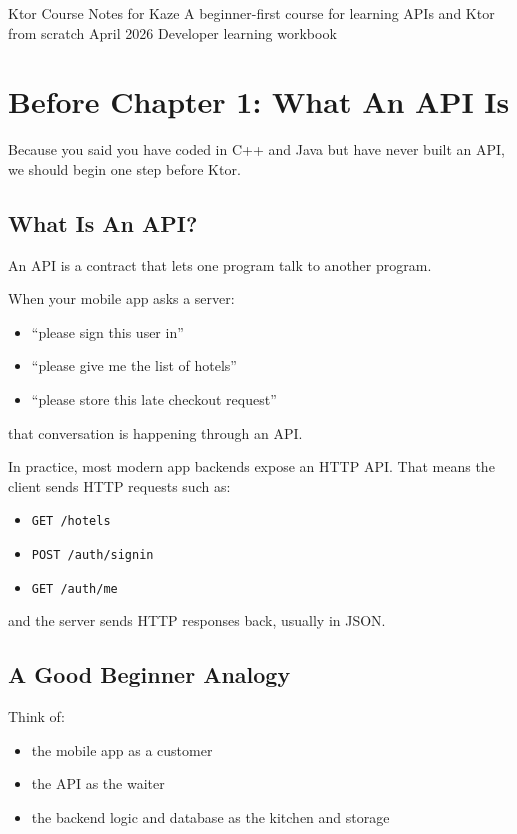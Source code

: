\documentclass[11pt,a4paper]{article}
\begin{document}
\KazeCover
  {Ktor Course Notes for Kaze}
  {A beginner-first course for learning APIs and Ktor from scratch}
  {April 2026}
  {Developer learning workbook}

\KazeDocumentNotice

\section{Before Chapter 1: What An API Is}

Because you said you have coded in C++ and Java but have never built an API, we should begin one step before Ktor.

\subsection{What Is An API?}

An API is a contract that lets one program talk to another program.

When your mobile app asks a server:
\begin{itemize}
    \item ``please sign this user in''
    \item ``please give me the list of hotels''
    \item ``please store this late checkout request''
\end{itemize}

that conversation is happening through an API.

In practice, most modern app backends expose an HTTP API. That means the client sends HTTP requests such as:
\begin{itemize}
    \item \texttt{GET /hotels}
    \item \texttt{POST /auth/signin}
    \item \texttt{GET /auth/me}
\end{itemize}

and the server sends HTTP responses back, usually in JSON.

\subsection{A Good Beginner Analogy}

Think of:
\begin{itemize}
    \item the mobile app as a customer
    \item the API as the waiter
    \item the backend logic and database as the kitchen and storage
\end{itemize}
\end{document}
